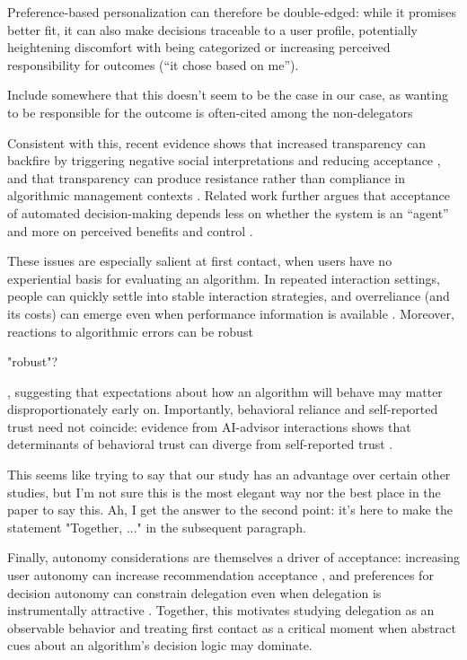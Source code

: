\documentclass[a4paper, 12pt, fleqn]{article}
\theoremstyle{definition}
\begin{document}
Preference-based personalization can therefore be double-edged: while it promises better fit, it can also make decisions traceable to a user profile, potentially heightening discomfort with being categorized or increasing perceived responsibility for outcomes (``it chose based on me'').
\begin{icomm}
	Include somewhere that this doesn't seem to be the case in our case, as wanting to be responsible for the outcome is often-cited among the non-delegators
\end{icomm}
 Consistent with this, recent evidence shows that increased transparency can backfire by triggering negative social interpretations and reducing acceptance \citep{Chen2024}, and that transparency can produce resistance rather than compliance in algorithmic management contexts \citep{Hu2024}. Related work further argues that acceptance of automated decision-making depends less on whether the system is an ``agent'' and more on perceived benefits and control \citep{Schaap2024}.

These issues are especially salient at {first contact}, when users have no experiential basis for evaluating an algorithm. In repeated interaction settings, people can quickly settle into stable interaction strategies, and overreliance (and its costs) can emerge even when performance information is available \citep{Klingbeil2024}. Moreover, reactions to algorithmic errors can be robust
\begin{icomm}
	"robust"?
\end{icomm} 
\citep{Renier2021}, suggesting that expectations about how an algorithm will behave may matter disproportionately early on. Importantly, behavioral reliance and self-reported trust need not coincide: evidence from AI-advisor interactions shows that determinants of behavioral trust can diverge from self-reported trust \citep{Schreibelmayr2025}. 
\begin{icomm}
	This seems like trying to say that our study has an advantage over certain other studies, but I'm not sure this is the most elegant way nor the best place in the paper to say this. Ah, I get the answer to the second point: it's here to make the statement "Together, ..." in the subsequent paragraph. 
\end{icomm}

Finally, autonomy considerations are themselves a driver of acceptance: increasing user autonomy can increase recommendation acceptance \citep{Fink2024}, and preferences for decision autonomy can constrain delegation even when delegation is instrumentally attractive \citep{Ivanova-Stenzel2025}. Together, this motivates studying delegation as an observable behavior and treating first contact as a critical moment when abstract cues about an algorithm's decision logic may dominate.
\end{document}
